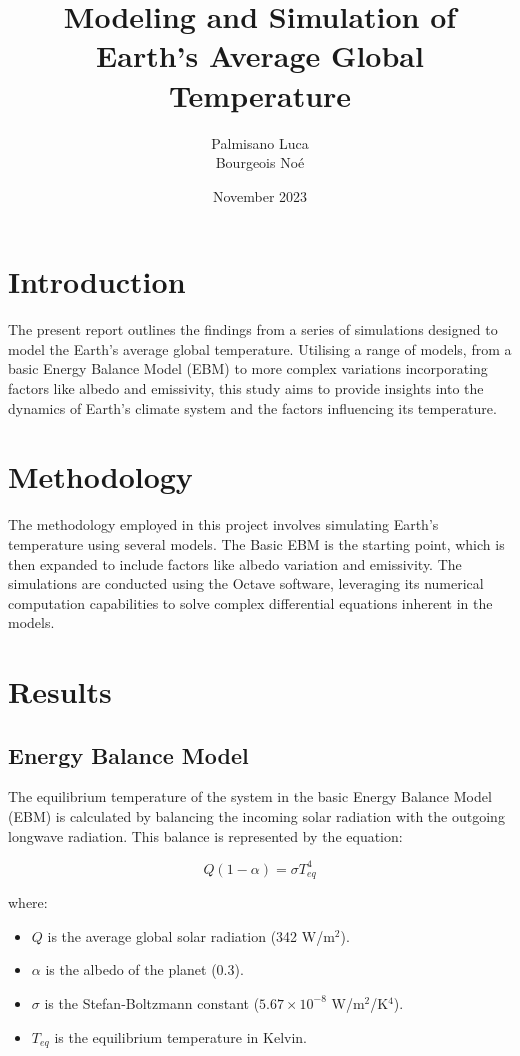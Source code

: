\documentclass[12pt]{article}
\title{Modeling and Simulation of Earth's Average Global Temperature}
\author{Palmisano Luca \\ Bourgeois Noé}
\date{November 2023}
\begin{document}
\maketitle
\newpage

\section{Introduction}
The present report outlines the findings from a series of simulations designed to model the Earth's average global temperature. Utilising a range of models, from a basic Energy Balance Model (EBM) to more complex variations incorporating factors like albedo and emissivity, this study aims to provide insights into the dynamics of Earth's climate system and the factors influencing its temperature.

\section{Methodology}
The methodology employed in this project involves simulating Earth's temperature using several models. The Basic EBM is the starting point, which is then expanded to include factors like albedo variation and emissivity. The simulations are conducted using the Octave software, leveraging its numerical computation capabilities to solve complex differential equations inherent in the models.

\section{Results}

\subsection{Energy Balance Model}
The equilibrium temperature of the system in the basic Energy Balance Model (EBM) is calculated by balancing the incoming solar radiation with the outgoing longwave radiation. This balance is represented by the equation:

\begin{equation}
Q(1 - \alpha) = \sigma T_{eq}^4
\end{equation}

where:
\begin{itemize}
    \item $Q$ is the average global solar radiation (342 W/m$^2$).
    \item $\alpha$ is the albedo of the planet (0.3).
    \item $\sigma$ is the Stefan-Boltzmann constant ($5.67 \times 10^{-8}$ W/m$^2$/K$^4$).
    \item $T_{eq}$ is the equilibrium temperature in Kelvin.
\end{itemize}
\end{document}
